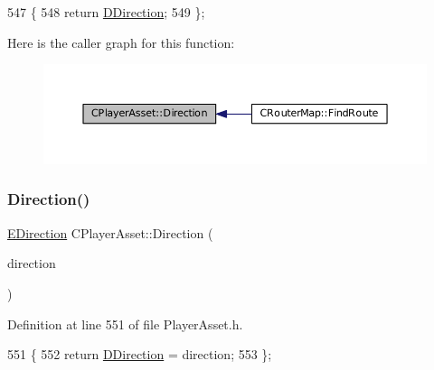 \begin{DoxyCode}
547                                     \{
548             \textcolor{keywordflow}{return} \hyperlink{classCPlayerAsset_a2f07e280268d0402220c583d1029d683}{DDirection};
549         \};
\end{DoxyCode}
Here is the caller graph for this function\+:\nopagebreak
\begin{figure}[H]
\begin{center}
\leavevmode
\includegraphics[width=350pt]{classCPlayerAsset_add74a452e9a030ae0d04d4281d964935_icgraph}
\end{center}
\end{figure}
\hypertarget{classCPlayerAsset_abda0d14d43b52315a40defa0a6a2440f}{}\label{classCPlayerAsset_abda0d14d43b52315a40defa0a6a2440f} 
\subsubsection{\texorpdfstring{Direction()}{Direction()}\hspace{0.1cm}{\footnotesize\ttfamily [2/2]}}
{\footnotesize\ttfamily \hyperlink{GameDataTypes_8h_acb2b033915f6659a71a38b5aa6e4eb42}{E\+Direction} C\+Player\+Asset\+::\+Direction (\begin{DoxyParamCaption}\item[{\hyperlink{GameDataTypes_8h_acb2b033915f6659a71a38b5aa6e4eb42}{E\+Direction}}]{direction }\end{DoxyParamCaption})\hspace{0.3cm}{\ttfamily [inline]}}



Definition at line 551 of file Player\+Asset.\+h.


\begin{DoxyCode}
551                                                   \{
552             \textcolor{keywordflow}{return} \hyperlink{classCPlayerAsset_a2f07e280268d0402220c583d1029d683}{DDirection} = direction;
553         \};
\end{DoxyCode}
\hypertarget{classCPlayerAsset_a1bceaff561a420eaa8924eeb421fd594}{}\label{classCPlayerAsset_a1bceaff561a420eaa8924eeb421fd594} 
